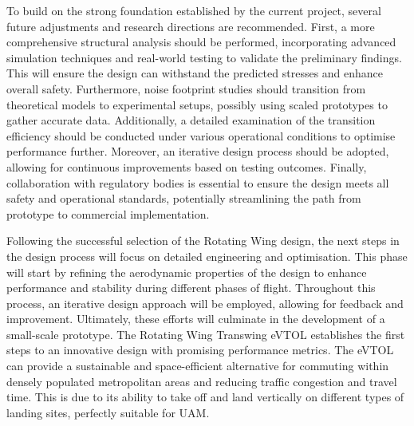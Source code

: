 To build on the strong foundation established by the current project, several future adjustments and research directions are recommended.
First, a more comprehensive structural analysis should be performed, incorporating advanced simulation techniques and real-world testing to validate the preliminary findings. 
This will ensure the design can withstand the predicted stresses and enhance overall safety. 
Furthermore, noise footprint studies should transition from theoretical models to experimental setups, possibly using scaled prototypes to gather accurate data. 
Additionally, a detailed examination of the transition efficiency should be conducted under various operational conditions to optimise performance further. 
Moreover, an iterative design process should be adopted, allowing for continuous improvements based on testing outcomes. 
Finally, collaboration with regulatory bodies is essential to ensure the design meets all safety and operational standards, potentially streamlining the path from prototype to commercial implementation.

Following the successful selection of the Rotating Wing design, the next steps in the design process will focus on detailed engineering and optimisation. 
This phase will start by refining the aerodynamic properties of the design to enhance performance and stability during different phases of flight. 
Throughout this process, an iterative design approach will be employed, allowing for feedback and improvement. 
Ultimately, these efforts will culminate in the development of a small-scale prototype. 
The Rotating Wing Transwing eVTOL establishes the first steps to an innovative design with promising performance metrics. 
The eVTOL can provide a sustainable and space-efficient alternative for commuting within densely populated metropolitan areas and reducing traffic congestion and travel time. This is due to its ability to take off and land vertically on different types of landing sites, perfectly suitable for UAM.



